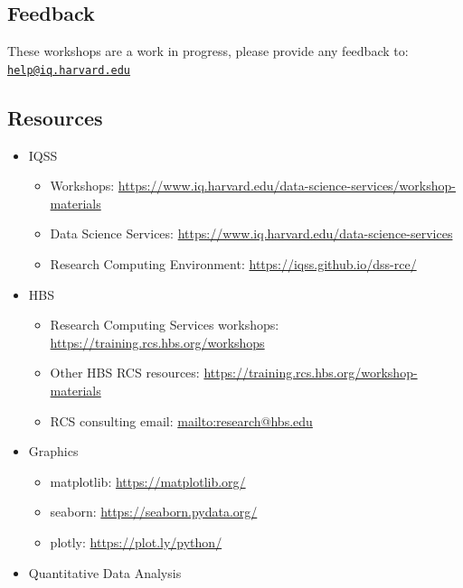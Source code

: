 \documentclass[
]{book}
\providecommand{\tightlist}{%
  \setlength{\itemsep}{0pt}\setlength{\parskip}{0pt}}
\begin{document}
\hypertarget{feedback-5}{%
\subsection{Feedback}\label{feedback-5}}

These workshops are a work in progress, please provide any feedback to: \href{mailto:help@iq.harvard.edu}{\nolinkurl{help@iq.harvard.edu}}

\hypertarget{resources-7}{%
\subsection{Resources}\label{resources-7}}

\begin{itemize}
\tightlist
\item
  IQSS

  \begin{itemize}
  \tightlist
  \item
    Workshops: \url{https://www.iq.harvard.edu/data-science-services/workshop-materials}
  \item
    Data Science Services: \url{https://www.iq.harvard.edu/data-science-services}
  \item
    Research Computing Environment: \url{https://iqss.github.io/dss-rce/}
  \end{itemize}
\item
  HBS

  \begin{itemize}
  \tightlist
  \item
    Research Computing Services workshops: \url{https://training.rcs.hbs.org/workshops}
  \item
    Other HBS RCS resources: \url{https://training.rcs.hbs.org/workshop-materials}
  \item
    RCS consulting email: \url{mailto:research@hbs.edu}
  \end{itemize}
\item
  Graphics

  \begin{itemize}
  \tightlist
  \item
    matplotlib: \url{https://matplotlib.org/}
  \item
    seaborn: \url{https://seaborn.pydata.org/}
  \item
    plotly: \url{https://plot.ly/python/}
  \end{itemize}
\item
  Quantitative Data Analysis


\end{itemize}
\end{document}
